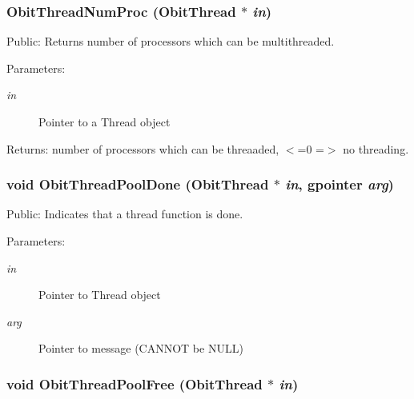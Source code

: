 \subsubsection{ Obit\-Thread\-Num\-Proc ({\bf Obit\-Thread} $\ast$ {\em in})}\label{ObitThread_8c_a21}


Public: Returns number of processors which can be multithreaded. 

\begin{Desc}
\item[Parameters:]
\begin{description}
\item[{\em in}]Pointer to a Thread object \end{description}
\end{Desc}
\begin{Desc}
\item[Returns:]number of processors which can be threaaded, $<$=0 =$>$ no threading. \end{Desc}
\subsubsection{\setlength{\rightskip}{0pt plus 5cm}void Obit\-Thread\-Pool\-Done ({\bf Obit\-Thread} $\ast$ {\em in}, gpointer {\em arg})}\label{ObitThread_8c_a24}


Public: Indicates that a thread function is done. 

\begin{Desc}
\item[Parameters:]
\begin{description}
\item[{\em in}]Pointer to Thread object \item[{\em arg}]Pointer to message (CANNOT be NULL) \end{description}
\end{Desc}
\subsubsection{\setlength{\rightskip}{0pt plus 5cm}void Obit\-Thread\-Pool\-Free ({\bf Obit\-Thread} $\ast$ {\em in})}\label{ObitThread_8c_a25}


